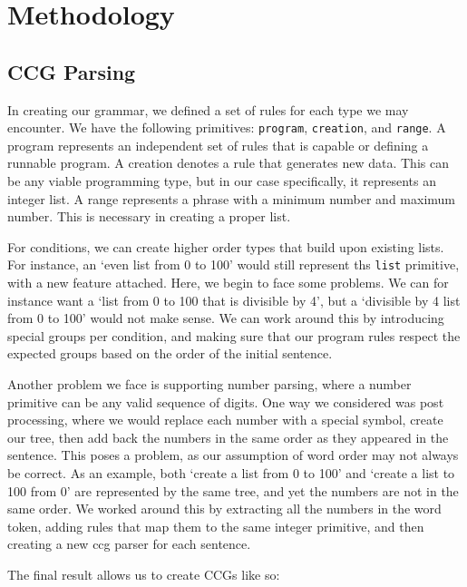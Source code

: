 \documentclass[11pt,letterpaper]{article}
\begin{document}

\section{Methodology}

\subsection{CCG Parsing}

In creating our grammar, we defined a set of rules for each type we may encounter. 
We have the following primitives: {\small\verb|program|}, {\small\verb|creation|}, and {\small\verb|range|}.
A program represents an independent set of rules that is capable or defining a runnable program.
A creation denotes a rule that generates new data. 
This can be any viable programming type, but in our case specifically, it represents an integer list.
A range represents a phrase with a minimum number and maximum number.
This is necessary in creating a proper list.

For conditions, we can create higher order types that build upon existing lists.
For instance, an `even list from 0 to 100' would still represent ths {\small\verb|list|} primitive, with a new feature attached.
Here, we begin to face some problems.
We can for instance want a `list from 0 to 100 that is divisible by 4', but a `divisible by 4 list from 0 to 100' would not make sense.
We can work around this by introducing special groups per condition, and making sure that our program rules respect the expected groups based on the order of the initial sentence.

Another problem we face is supporting number parsing, where a number primitive can be any valid sequence of digits. 
One way we considered was post processing, where we would replace each number with a special symbol, create our tree, then add back the numbers in the same order as they appeared in the sentence.
This poses a problem, as our assumption of word order may not always be correct. As an example, both `create a list from 0 to 100' and `create a list to 100 from 0' are represented by the same tree, and yet the numbers are not in the same order.
We worked around this by extracting all the numbers in the word token, adding rules that map them to the same integer primitive, and then creating a new ccg parser for each sentence.

The final result allows us to create CCGs like so:
\end{document}
